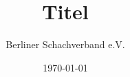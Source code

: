 \documentclass[fontsize=12pt, paper=a4, ngerman]{article}
\begin{document}
\author{ Berliner Schachverband e.V. } \title{Titel} \date{\today} \maketitle

\tableofcontents

\newpage
\end{document}
